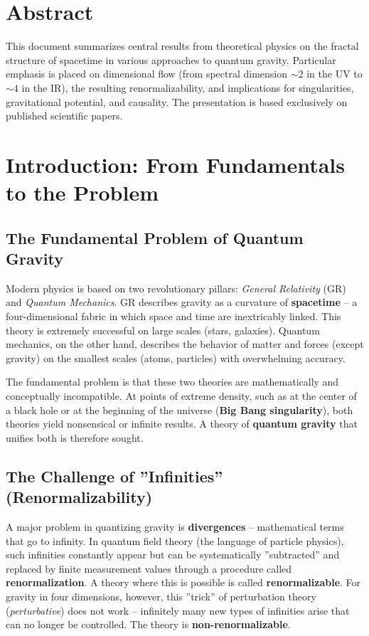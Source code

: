 \section*{Abstract}
		This document summarizes central results from theoretical physics on the fractal structure of spacetime in various approaches to quantum gravity. Particular emphasis is placed on dimensional flow (from spectral dimension $\sim 2$ in the UV to $\sim 4$ in the IR), the resulting renormalizability, and implications for singularities, gravitational potential, and causality. The presentation is based exclusively on published scientific papers.

	
	\section{Introduction: From Fundamentals to the Problem}
	\subsection{The Fundamental Problem of Quantum Gravity}
	Modern physics is based on two revolutionary pillars: \emph{General Relativity} (GR) and \emph{Quantum Mechanics}. GR describes gravity as a curvature of \textbf{spacetime} – a four-dimensional fabric in which space and time are inextricably linked. This theory is extremely successful on large scales (stars, galaxies). Quantum mechanics, on the other hand, describes the behavior of matter and forces (except gravity) on the smallest scales (atoms, particles) with overwhelming accuracy.
	
	The fundamental problem is that these two theories are mathematically and conceptually incompatible. At points of extreme density, such as at the center of a black hole or at the beginning of the universe (\textbf{Big Bang singularity}), both theories yield nonsensical or infinite results. A theory of \textbf{quantum gravity} that unifies both is therefore sought.
	
	\subsection{The Challenge of ''Infinities'' (Renormalizability)}
	A major problem in quantizing gravity is \textbf{divergences} – mathematical terms that go to infinity. In quantum field theory (the language of particle physics), such infinities constantly appear but can be systematically ''subtracted'' and replaced by finite measurement values through a procedure called \textbf{renormalization}. A theory where this is possible is called \textbf{renormalizable}. For gravity in four dimensions, however, this ''trick'' of perturbation theory (\emph{perturbative}) does not work – infinitely many new types of infinities arise that can no longer be controlled. The theory is \textbf{non-renormalizable}.
	
